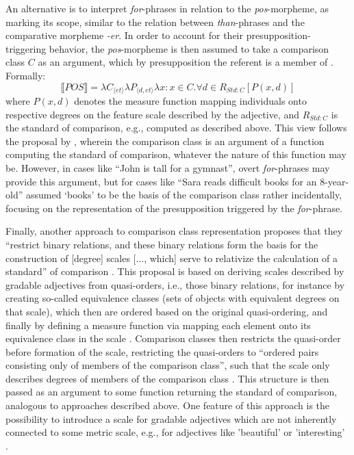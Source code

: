 An alternative is to interpret \textit{for}-phrases in relation to the \textit{pos}-morpheme, as marking its scope, similar to the relation between \textit{than}-phrases and the comparative morpheme \textit{-er}. In order to account for their presupposition-triggering behavior, the \textit{pos}-morpheme is then assumed to take a comparison class $C$ as an argument, which by presupposition the referent is a member of \parencite{Solt2009}. 
Formally:
$$\llbracket POS \rrbracket = \lambda C_{\langle et \rangle } \lambda P_{\langle d, et \rangle } \lambda x: x \in C.\forall d \in R_{Std:C}[P(x,d)]$$ 
where $P(x,d)$ denotes the measure function mapping individuals onto respective degrees on the feature scale described by the adjective, and $R_{Std:C}$ is the standard of comparison, e.g., computed as described above.
This view follows the proposal by \textcite{bartsch1972}, wherein the comparison class is an argument of a function computing the standard of comparison, whatever the nature of this function may be.  However, in cases like “John is tall for a gymnast”, overt \textit{for}-phrases may provide this argument, but for cases like “Sara reads difficult books for an 8-year-old” \textcite{Solt2009} assumed ‘books’ to be the basis of the comparison class rather incidentally, focusing on the representation of the presupposition triggered by the \textit{for}-phrase. 

Finally, another approach to comparison class representation proposes that they “restrict binary relations, and these binary relations form the basis for the construction of [degree] scales [..., which] serve to relativize the calculation of a standard” of comparison \parencite[p.170]{Bale2011}. This proposal is based on deriving scales described by gradable adjectives from quasi-orders, i.e., those binary relations, for instance by creating so-called equivalence classes (sets of objects with equivalent degrees on that scale), which then are ordered based on the original quasi-ordering, and finally by defining a measure function via mapping each element onto its equivalence class in the scale \parencite{Bale2011}. Comparison classes then restricts the quasi-order before formation of the scale, restricting the quasi-orders to “ordered pairs consisting only of members of the comparison class”, such that the scale only describes degrees of members of the comparison class \parencite[p.178]{Bale2011}. This structure is then passed as an argument to some function returning the standard of comparison, analogous to approaches described above. One feature of this approach is the possibility to introduce a scale for gradable adjectives which are not inherently connected to some metric scale, e.g., for adjectives like 'beautiful' or 'interesting' \parencite{Bale2011}.   

